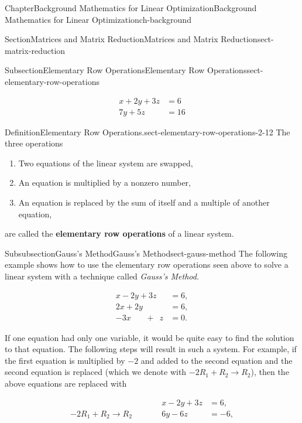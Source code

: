 \documentclass[oneside,10pt,]{book}
\newcommand{\terminology}[1]{\textbf{#1}}
\numberwithin{equation}{section}
\newcommand{\amp}{&}
\begin{document}
\begin{chapterptx}{Chapter}{Background Mathematics for Linear Optimization}{}{Background Mathematics for Linear Optimization}{}{}{ch-background}
\begin{sectionptx}{Section}{Matrices and Matrix Reduction}{}{Matrices and Matrix Reduction}{}{}{sect-matrix-reduction}
\begin{subsectionptx}{Subsection}{Elementary Row Operations}{}{Elementary Row Operations}{}{}{sect-elementary-row-operations}
\begin{introduction}{}
\par
%
\begin{align*}
x+2y+3z \amp =6 \\
7y + 5z \amp = 16
\end{align*}
%
\begin{definition}{Definition}{Elementary Row Operations.}{sect-elementary-row-operations-2-12}%
The three operations%
\par
%
\begin{enumerate}
\item{}Two equations of the linear system are swapped,%
\item{}An equation is multiplied by a nonzero number,%
\item{}An equation is replaced by the sum of itself and a multiple of another equation,%
\end{enumerate}
%
\par
are called the \terminology{elementary row operations} of a linear system.%
\end{definition}
\end{introduction}%
%
%
\typeout{************************************************}
\typeout{************************************************}
%
\begin{subsubsectionptx}{Subsubsection}{Gauss's Method}{}{Gauss's Method}{}{}{sect-gauss-method}
The following example shows how to use the elementary row operations seen above to solve a linear system with a technique called \emph{Gauss's	Method}.%
\par
%
\begin{align*}
x -2y + 3z \amp = 6, \\
2x + 2y\phantom{+3z} \amp = 6, \\
-3x \phantom{+2y}+\phantom{3} z \amp = 0.
\end{align*}
%
\par
If one equation had only one variable, it would be quite easy to find the solution to that equation. The following steps will result in such a system. For example, if the first equation is multiplied by \(-2\) and added to the second equation and the second equation is replaced (which we denote with \(-2R_1+R_2 \rightarrow R_2\)), then the above equations are replaced with%
\par
%
\begin{align*}
\amp \amp x -2y + 3z \amp = 6, \\
-2R_1+R_2 \rightarrow R_2\qquad\amp \amp 6 y-6z \amp = -6, \\

\end{align*}
\end{subsubsectionptx}
\end{subsectionptx}
\end{sectionptx}
\end{chapterptx}
\end{document}
